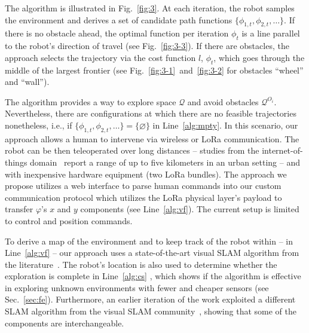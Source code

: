 \documentclass[letterpaper,10pt,conference,twoside]{IEEEtran}
\theoremstyle{definition}
\begin{document}
The algorithm is illustrated in Fig.~\ref{fig:3}. At each iteration, the robot samples the environment and derives a set of %
candidate path functions $\{\phi_{1,t},\phi_{2,t},\dots\}$. If there is no obstacle ahead, the optimal function per iteration $\phi_t$ is a line parallel to the robot's direction of travel (see Fig.~\ref{fig:3-3}). If there are obstacles, the %
approach selects the trajectory via the cost function $l$, $\phi_t$, which goes through the middle of the largest frontier (see Fig.~\ref{fig:3-1}~and~\ref{fig:3-2} for %
obstacles ``wheel'' and ``wall'').

The %
algorithm provides a way to explore space $\mathcal{Q}$ and avoid obstacles $\mathcal{Q}^{O_i}$. 
Nevertheless, there are configurations at which there are no feasible trajectories nonetheless, i.e., if $\{\phi_{1,t},\phi_{2,t},\dots\}=\{\varnothing\}$ in Line~\ref{alg:mpty}. In this scenario, %
our approach allows a human to intervene via %
wireless or LoRa communication. The robot can be then teleoperated over long distances -- studies from the internet-of-things domain~\cite{shanmuga2020survey%
} report a range of up to five kilometers in an urban setting -- and with %
inexpensive hardware equipment (two LoRa bundles). The %
approach we propose utilizes a web interface to parse human commands into our custom communication protocol which utilizes the LoRa physical layer's payload to transfer $\varphi$'s $x$ and $y$ components (see Line~\ref{alg:vf}). The current setup is limited to control and position commands.

To derive a map of the environment and to keep %
track of the robot within -- in Line~\ref{alg:vf} -- our %
approach uses a state-of-the-art visual SLAM algorithm from the literature~\cite{labbe2019rtab}. The robot's location is also used to determine whether the exploration is complete in Line~\ref{alg:cs}%
, %
which shows if the algorithm is effective in exploring unknown environments with fewer and cheaper sensors %
(see Sec.~\ref{sec:fe}). Furthermore, an earlier iteration of the work exploited a different SLAM algorithm from the visual SLAM community~\cite{campos2021orb}, showing that some of the %
components are interchangeable.
\end{document}
